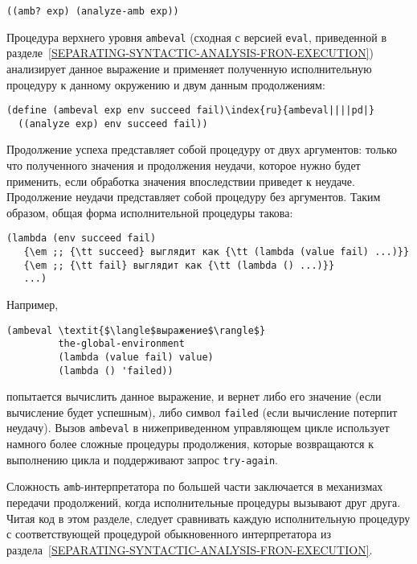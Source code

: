 \begin{Verbatim}[fontsize=\small]
((amb? exp) (analyze-amb exp))
\end{Verbatim}

Процедура верхнего уровня {\tt ambeval} (сходная с
версией {\tt eval}, приведенной в 
разделе~\ref{SEPARATING-SYNTACTIC-ANALYSIS-FRON-EXECUTION})
анализирует данное выражение и применяет полученную исполнительную
процедуру к данному окружению и двум данным 
продолжениям:

\begin{Verbatim}[fontsize=\small]
(define (ambeval exp env succeed fail)\index{ru}{ambeval||||pd|}
  ((analyze exp) env succeed fail))
\end{Verbatim}

Продолжение успеха представляет собой процедуру 
от двух
аргументов: только что полученного значения и продолжения неудачи,
которое нужно будет применить, если обработка значения впоследствии приведет
к неудаче.  Продолжение неудачи представляет собой процедуру без
аргументов.  Таким образом, общая форма  исполнительной процедуры
такова:
 
\begin{Verbatim}[fontsize=\small]
(lambda (env succeed fail)
   {\em ;; {\tt succeed} выглядит как {\tt (lambda (value fail) ...)}}
   {\em ;; {\tt fail} выглядит как {\tt (lambda () ...)}}
   ...)
\end{Verbatim}

Например,

\begin{Verbatim}[fontsize=\small]
(ambeval \textit{$\langle$выражение$\rangle$}
         the-global-environment
         (lambda (value fail) value)
         (lambda () 'failed))
\end{Verbatim}
попытается вычислить данное выражение, и вернет либо его значение
(если вычисление будет успешным), либо символ 
{\tt failed} (если вычисление потерпит неудачу).  Вызов
{\tt ambeval} в нижеприведенном управляющем цикле использует
намного более сложные процедуры продолжения, которые возвращаются к 
выполнению цикла и поддерживают запрос {\tt try-again}.

Сложность {\tt amb}-интерпретатора по большей части
заключается в механизмах передачи продолжений, когда исполнительные
процедуры вызывают друг друга.  Читая код в этом разделе, следует
сравнивать каждую исполнительную процедуру с соответствующей процедурой
обыкновенного интерпретатора из 
раздела~\ref{SEPARATING-SYNTACTIC-ANALYSIS-FRON-EXECUTION}.

